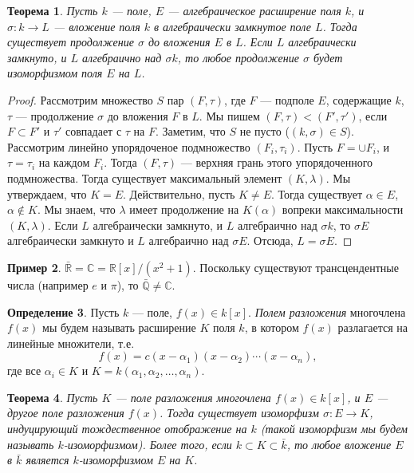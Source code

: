 \documentclass[12pt, titlepage, oneside]{amsbook}
\newcommand{\RR}{\mathbb{R}}
\newcommand{\CC}{\mathbb{C}}
\newcommand{\QQ}{\mathbb{Q}}
\newtheorem{theorem}{Теорема}[chapter]
\theoremstyle{definition}
\newtheorem{example}[theorem]{Пример}
\newtheorem{definition}[theorem]{Определение}
\theoremstyle{remark}
\begin{document}
\begin{theorem}
\label{Nor2}
Пусть $k$ --- поле, $E$ --- алгебраическое расширение поля $k$, и $\sigma\colon k\rightarrow L$ --- вложение поля $k$ в алгебраически замкнутое поле $L$. Тогда существует продолжение $\sigma$ до вложения $E$ в $L$. Если $L$ алгебраически замкнуто, и $L$ алгебраично над $\sigma k$, то любое продолжение $\sigma$ будет изоморфизмом поля $E$ на $L$.
\end{theorem}

\begin{proof}
Рассмотрим множество $S$ пар $(F,\tau)$, где $F$ --- подполе $E$, содержащие $k$, $\tau$ --- продолжение $\sigma$ до вложения $F$ в $L$. Мы пишем $(F,\tau)<(F',\tau')$, если $F\subset F'$ и $\tau'$ совпадает с $\tau$ на $F$. Заметим, что $S$ не пусто ($(k,\sigma)\in S$). Рассмотрим линейно упорядоченое подмножество $(F_{i},\tau_{i})$. Пусть $F=\cup F_i$, и $\tau=\tau_i$ на каждом $F_i$. Тогда $(F,\tau)$ --- верхняя грань этого упорядоченного подмножества. Тогда существует максимальный элемент $(K,\lambda)$. Мы утверждаем, что $K=E$. Действительно, пусть $K\neq E$. Тогда существует $\alpha\in E$, $\alpha\not\in K$. Мы знаем, что $\lambda$ имеет продолжение на $K(\alpha)$ вопреки максимальности $(K,\lambda)$. Если $L$ алгебраически замкнуто, и $L$ алгебраично над $\sigma k$, то $\sigma E$ алгебраически замкнуто и $L$ алгебраично над $\sigma E$. Отсюда, $L=\sigma E$.
\end{proof}

\begin{example}
$\bar{\RR}=\CC=\RR[x]/(x^2+1)$. Поскольку существуют трансцендентные числа (например $e$ и $\pi$), то $\bar{\QQ}\neq\CC$.
\end{example}

\begin{definition}
Пусть $k$ --- поле, $f(x)\in k[x]$. \emph{Полем разложения} многочлена $f(x)$ мы будем называть расширение $K$ поля $k$, в котором $f(x)$ разлагается на линейные множители, т.е. $$f(x)=c(x-\alpha_1)(x-\alpha_2)\cdots(x-\alpha_n),$$ где все $\alpha_i\in K$ и $K=k(\alpha_1,\alpha_2,\ldots,\alpha_n)$.
\end{definition}

\begin{theorem}
\label{Nor3}
Пусть $K$ --- поле разложения многочлена $f(x)\in k[x]$, и $E$ --- другое поле разложения $f(x)$. Тогда существует изоморфизм $\sigma\colon E\rightarrow K$, индуцирующий тождественное отображение на $k$ (такой изоморфизм мы будем называть $k$-изоморфизмом). Более того, если $k\subset K\subset\bar{k}$, то любое вложение $E$ в $\bar{k}$ является $k$-изоморфизмом $E$ на $K$.
\end{theorem}
\end{document}
